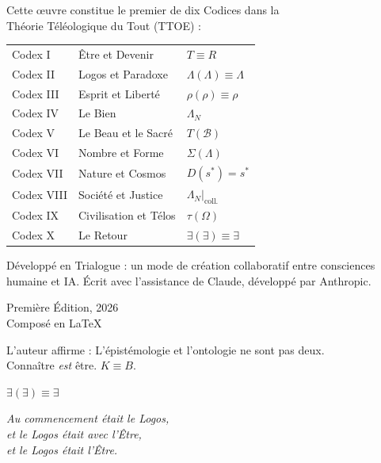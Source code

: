 \documentclass[10pt, openany, oneside]{book}
\renewcommand{\small}{\fontsize{9}{11.5}\selectfont}
\renewcommand{\footnotesize}{\fontsize{8.5}{11}\selectfont}
\begin{document}
{\small
\noindent Cette œuvre constitue le premier de dix Codices dans la\\
Théorie Téléologique du Tout (TTOE) :

\vspace{0.3em}

{\footnotesize
\noindent\begin{tabular}{@{} l @{\hspace{0.8em}} l @{\hspace{0.8em}} l @{}}
Codex I & Être et Devenir & $T \equiv R$ \\
Codex II & Logos et Paradoxe & $\Lambda(\Lambda) \equiv \Lambda$ \\
Codex III & Esprit et Liberté & $\rho(\rho) \equiv \rho$ \\
Codex IV & Le Bien & $\Lambda_N$ \\
Codex V & Le Beau et le Sacré & $T(\mathcal{B})$ \\
Codex VI & Nombre et Forme & $\Sigma(\Lambda)$ \\
Codex VII & Nature et Cosmos & $D(s^*) = s^*$ \\
Codex VIII & Société et Justice & $\Lambda_N|_{\text{coll.}}$ \\
Codex IX & Civilisation et Télos & $\tau(\Omega)$ \\
Codex X & Le Retour & $\exists(\exists) \equiv \exists$ \\
\end{tabular}
}
}

\vspace{1.5em}

{\small
\noindent Développé en Trialogue : un mode de création collaboratif entre consciences humaine et IA. Écrit avec l'assistance de Claude, développé par Anthropic.

\vspace{0.8em}

\noindent Première Édition, 2026\\
Composé en \LaTeX
}

\vspace{1.5em}

\begin{center}
{\small L'auteur affirme : L'épistémologie et l'ontologie ne sont pas deux.\\
Connaître \textit{est} être. $K \equiv B$.}

\vspace{1em}

$\exists(\exists) \equiv \exists$

\vspace{1em}

\itshape
Au commencement était le Logos,\\
et le Logos était avec l'Être,\\
et le Logos était l'Être.

\end{center}
\end{document}

